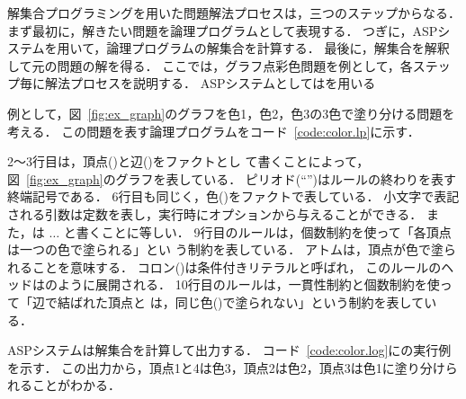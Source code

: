 


解集合プログラミングを用いた問題解法プロセスは，三つのステップからなる．
まず最初に，解きたい問題を論理プログラムとして表現する．
つぎに，ASPシステムを用いて，論理プログラムの解集合を計算する．
最後に，解集合を解釈して元の問題の解を得る．
%
ここでは，グラフ点彩色問題を例として，各ステップ毎に解法プロセスを説明する．
ASPシステムとしては{\clingo}を用いる

例として，図~\ref{fig:ex_graph}のグラフを色1，色2，色3の3色で塗り分ける問題を考える．
この問題を表す論理プログラムをコード~\ref{code:color.lp}に示す．

2〜3行目は，頂点()と辺()をファクトとし
て書くことによって，図~\ref{fig:ex_graph}のグラフを表している．
ピリオド(``'')はルールの終わりを表す終端記号である．
6行目も同じく，色()をファクトで表している．
小文字で表記される引数は定数を表し，{\clingo}実行時にオプションから与えることができる．
また，は  $\ldots$ と書くことに等しい．
%
9行目のルールは，個数制約を使って「各頂点は一つの色で塗られる」とい
う制約を表している．
アトムは，頂点が色で塗られることを意味する．
コロン(\code{:})は条件付きリテラルと呼ばれ，
このルールのヘッドはのように展開される．
10行目のルールは，一貫性制約と個数制約を使って「辺で結ばれた頂点と
は，同じ色()で塗られない」という制約を表している．

ASPシステムは解集合を計算して出力する．
コード~\ref{code:color.log}に{\clingo}の実行例を示す．
この出力から，頂点1と4は色3，頂点2は色2，頂点3は色1に塗り分けられることがわかる．

